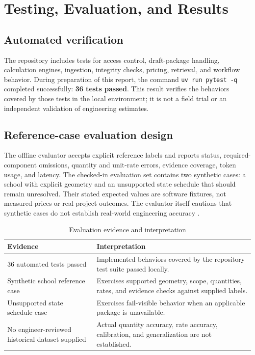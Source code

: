 \section{Testing, Evaluation, and Results}
\subsection{Automated verification}
The repository includes tests for access control, draft-package handling, calculation engines, ingestion, integrity checks, pricing, retrieval, and workflow behavior. During preparation of this report, the command \texttt{uv run pytest -q} completed successfully: \textbf{36 tests passed}. This result verifies the behaviors covered by those tests in the local environment; it is not a field trial or an independent validation of engineering estimates.

\subsection{Reference-case evaluation design}
The offline evaluator accepts explicit reference labels and reports status, required-component omissions, quantity and unit-rate errors, evidence coverage, token usage, and latency. The checked-in evaluation set contains two synthetic cases: a school with explicit geometry and an unsupported state schedule that should remain unresolved. Their stated expected values are software fixtures, not measured prices or real project outcomes. The evaluator itself cautions that synthetic cases do not establish real-world engineering accuracy \cite{tenderworks2026}.

\begin{table}[htbp]
\centering
\caption{Evaluation evidence and interpretation}
\label{tab:evaluation}
\begin{tabularx}{\textwidth}{p{}X}
\toprule
\textbf{Evidence} & \textbf{Interpretation}\\
\midrule
36 automated tests passed & Implemented behaviors covered by the repository test suite passed locally.\\
Synthetic school reference case & Exercises supported geometry, scope, quantities, rates, and evidence checks against supplied labels.\\
Unsupported state schedule case & Exercises fail-visible behavior when an applicable package is unavailable.\\
No engineer-reviewed historical dataset supplied & Actual quantity accuracy, rate accuracy, calibration, and generalization are not established.\\
\bottomrule
\end{tabularx}
\end{table}

